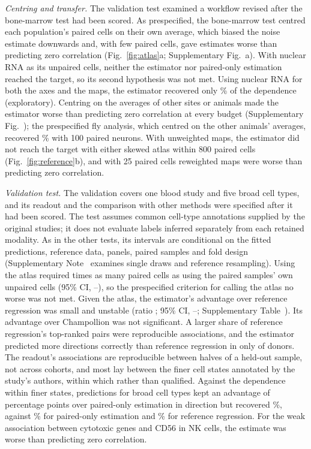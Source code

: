 \documentclass[pdflatex,sn-vancouver-num,iicol]{sn-jnl}
\begin{document}
\textit{Centring and transfer.} The validation test examined a workflow revised after the bone-marrow test had been scored. As prespecified, the bone-marrow test centred each population's paired cells on their own average, which biased the noise estimate downwards and, with few paired cells, gave estimates worse than predicting zero correlation (Fig.~\ref{fig:atlas}a; Supplementary Fig.~a). With nuclear RNA as its unpaired cells, neither the estimator nor paired-only estimation reached the target, so its second hypothesis was not met. Using nuclear RNA for both the axes and the maps, the estimator recovered only \MpAssayMapped\% of the dependence (exploratory). Centring on the averages of other sites or animals made the estimator worse than predicting zero correlation at every budget (Supplementary Fig.~); the prespecified fly analysis, which centred on the other animals' averages, recovered \FxPoolHundred\% with 100 paired neurons. With unweighted maps, the estimator did not reach the target with either skewed atlas within 800 paired cells (Fig.~\ref{fig:reference}b), and with 25 paired cells reweighted maps were worse than predicting zero correlation.

\textit{Validation test.} The validation covers one blood study and five broad cell types, and its readout and the comparison with other methods were specified after it had been scored. The test assumes common cell-type annotations supplied by the original studies; it does not evaluate labels inferred separately from each retained modality. As in the other tests, its intervals are conditional on the fitted predictions, reference data, panels, paired samples and fold design (Supplementary Note~ examines single draws and reference resampling). Using the atlas required \VlAtlasOverOwn{} times as many paired cells as using the paired samples' own unpaired cells (95\% CI, \VlAtlasOverOwnLo--\VlAtlasOverOwnHi), so the prespecified criterion for calling the atlas no worse was not met. Given the atlas, the estimator's advantage over reference regression was small and unstable (ratio \AltRatioRidge; 95\% CI, \AltRatioRidgeLo--\AltRatioRidgeHi; Supplementary Table~). Its advantage over Champollion was not significant. A larger share of reference regression's top-ranked pairs were reproducible associations, and the estimator predicted more directions correctly than reference regression in only \RvDonorBetterReg{} of \RvDonorN{} donors. The readout's associations are reproducible between halves of a held-out sample, not across cohorts, and most lay between the finer cell states annotated by the study's authors, within which \RvFineReps{} rather than \RvPrimaryReps{} qualified. Against the dependence within finer states, predictions for broad cell types kept an advantage of \RvFineOneMinusPo{} percentage points over paired-only estimation in direction but recovered \RvFineRfAtlas\%, against \RvFineRfPo\% for paired-only estimation and \RvFineRfReg\% for reference regression. For the weak association between cytotoxic genes and CD56 in NK cells, the estimate was worse than predicting zero correlation.
\end{document}
